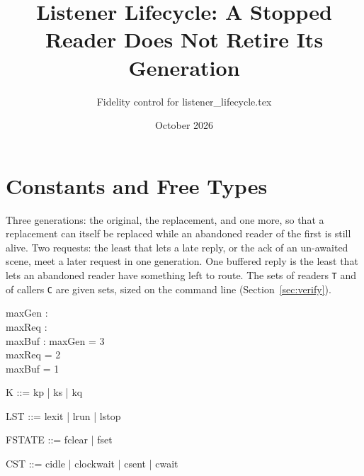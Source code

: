 \documentclass[a4paper,10pt,fleqn]{article}
\begin{document}
\title{Listener Lifecycle: A Stopped Reader Does Not Retire Its Generation}
\author{Fidelity control for listener\_lifecycle.tex}
\date{October 2026}
\maketitle

\section{Constants and Free Types}

Three generations: the original, the replacement, and one more, so that a
replacement can itself be replaced while an abandoned reader of the first is
still alive.  Two requests: the least that lets a late reply, or the ack of an
un-awaited scene, meet a later request in one generation.  One buffered reply
is the least that lets an abandoned reader have something left to route.  The
sets of readers \texttt{T} and of callers \texttt{C} are given sets, sized on
the command line (Section~\ref{sec:verify}).

\begin{axdef}
  maxGen : \nat \\
  maxReq : \nat \\
  maxBuf : \nat
\where
  maxGen = 3 \\
  maxReq = 2 \\
  maxBuf = 1
\end{axdef}

\begin{zed}
  [T]
\end{zed}

\begin{zed}
  [C]
\end{zed}

\begin{zed}
  K ::= kp | ks | kq
\end{zed}

\begin{zed}
  LST ::= lexit | lrun | lstop
\end{zed}

\begin{zed}
  FSTATE ::= fclear | fset
\end{zed}

\begin{zed}
  CST ::= cidle | clockwait | csent | cwait
\end{zed}
\end{document}
